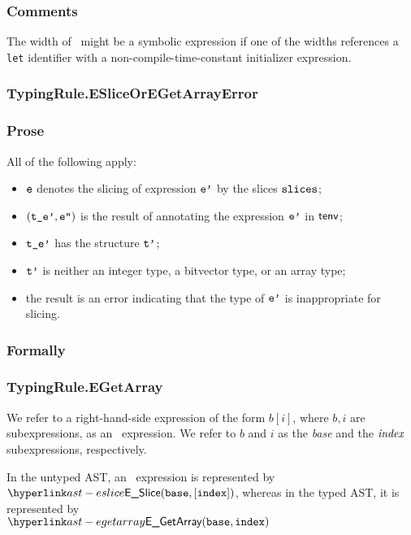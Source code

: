 \subsubsection{Comments}
The width of \slices\ might be a symbolic expression if one of the
widths references a \texttt{let} identifier with a non-compile-time-constant
initializer expression.

\subsubsection{TypingRule.ESliceOrEGetArrayError\label{sec:TypingRule.ESliceOrEGetArrayError}}
\subsubsection{Prose}
All of the following apply:
\begin{itemize}
  \item $\ve$ denotes the slicing of expression $\vep$ by the slices $\slices$;
  \item $(\tep,\vepp)$ is the result of annotating the expression $\vep$ in $\tenv$;
  \item $\tep$ has the structure $\vtp$;
  \item $\vtp$ is neither an integer type, a bitvector type, or an array type;
  \item the result is an error indicating that the type of $\vep$ is inappropriate for slicing.
\end{itemize}
\subsubsection{Formally}
\begin{mathpar}
\end{mathpar}

\subsubsection{TypingRule.EGetArray\label{sec:TypingRule.EGetArray}}
\hypertarget{def-arrayaccess}{}
\begin{definition}
We refer to a right-hand-side expression of the form $b[i]$,
where $b, i$ are subexpressions, as an \arrayaccess\ expression.
We refer to $b$ and $i$ as the \emph{base}
and the $\emph{index}$ subexpressions, respectively.

In the untyped AST, an \arrayaccess\ expression is represented by \\
$\ESlice(\vbase, [\vindex])$, whereas in the typed AST,
it is represented by \\
$\EGetArray(\vbase, \vindex)$
\end{definition}

